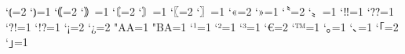\inhibitxspcode`⦅=2
\inhibitxspcode`⦆=1
\inhibitxspcode`｟=2
\inhibitxspcode`｠=1
\inhibitxspcode`〘=2
\inhibitxspcode`〙=1
\inhibitxspcode`〖=2
\inhibitxspcode`〗=1
\inhibitxspcode`«=2
\inhibitxspcode`»=1
\inhibitxspcode`〝=2
\inhibitxspcode`〟=1
\inhibitxspcode`‼=1
\inhibitxspcode`⁇=1
\inhibitxspcode`⁈=1
\inhibitxspcode`⁉=1
\inhibitxspcode`¡=2
\inhibitxspcode`¿=2
\inhibitxspcode"AA=1%
\inhibitxspcode"BA=1%
\inhibitxspcode`¹=1
\inhibitxspcode`²=1
\inhibitxspcode`³=1
\inhibitxspcode`€=2
\inhibitxspcode`™=1
\inhibitxspcode`｡=1
\inhibitxspcode`､=1
\inhibitxspcode`｢=2
\inhibitxspcode`｣=1
\endinput
